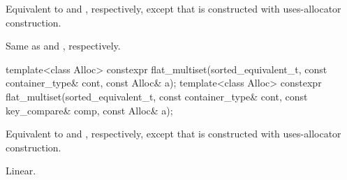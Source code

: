 \begin{itemdescr}
\pnum
\effects
Equivalent to  and
, respectively,
except that  is constructed with
uses-allocator construction.

\pnum
\complexity
Same as  and
, respectively.
\end{itemdescr}

%
\begin{itemdecl}
template<class Alloc>
  constexpr flat_multiset(sorted_equivalent_t, const container_type& cont, const Alloc& a);
template<class Alloc>
  constexpr flat_multiset(sorted_equivalent_t, const container_type& cont,
                          const key_compare& comp, const Alloc& a);
\end{itemdecl}

\begin{itemdescr}
\pnum
\effects
Equivalent to  and
, respectively,
except that  is constructed with
uses-allocator construction.

\pnum
\complexity
Linear.
\end{itemdescr}

